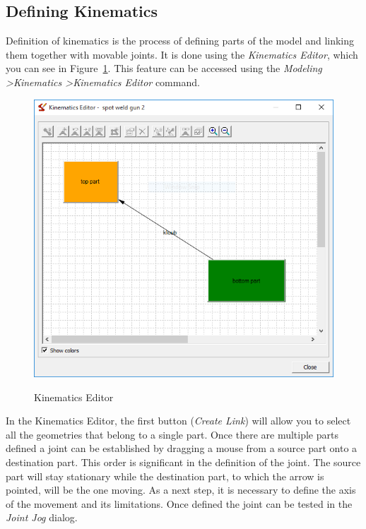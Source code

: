\subsection{Defining Kinematics}
Definition of kinematics is the process of defining parts of the model and linking them together with movable joints.
It is done using the \emph{Kinematics Editor}, which you can see in Figure~\ref{fig:KinematicsEditor}. This feature can be accessed using the \emph{Modeling \textgreater Kinematics \textgreater Kinematics Editor} command. \\

\begin{figure}[H]
    \caption{Kinematics Editor}
    \centering
    \includegraphics{kinematics_editor}
    \label{fig:KinematicsEditor}
\end{figure}

In the Kinematics Editor, the first button (\emph{Create Link}) will allow you to select all the geometries that belong to a single part.
Once there are multiple parts defined a joint can be established by dragging a mouse from a source part onto a destination part.
This order is significant in the definition of the joint. 
The source part will stay stationary while the destination part, to which the arrow is pointed, will be the one moving.
As a next step, it is necessary to define the axis of the movement and its limitations.
Once defined the joint can be tested in the \emph{Joint Jog} dialog. \\

